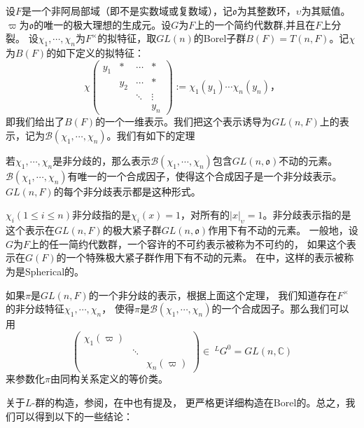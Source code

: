   \begin{example}
  设$F$是一个非阿局部域（即不是实数域或复数域），记$\mathfrak{o}$为其整数环，$\upsilon$为其赋值。
  $\varpi$为$\mathfrak{o}$的唯一的极大理想的生成元。设$G$为$F$上的一个简约代数群,并且在$F$上分裂。
  设$\chi_1,\cdots,\chi_n$为$F^{\times}$的拟特征，取$GL(n)$的Borel子群$B(F)=
  T(n,F)$。记$\chi$为$B(F)$的如下定义的拟特征：
  $$\chi\left(
  \begin{array}{llll}
  y_1 & \ast & \cdots & \ast \\
  & y_2 &\cdots & \ast       \\
  & & \ddots & \vdots        \\
  & & & y_n
  \end{array}\right)
  := \chi_1(y_1)\cdots \chi_n(y_n)，$$
  即我们给出了$B(F)$的一个一维表示。我们把这个表示诱导为$GL(n,F)$上的表示，记为$\mathcal
  {B}(\chi_1,\cdots,\chi_n)$。我们有如下的定理

  \begin{theorem}
  若$\chi_1,\cdots,\chi_n$是非分歧的，那么表示$\mathcal
  {B}(\chi_1,\cdots,\chi_n)$包含$GL(n, \mathfrak{o})$不动的元素。$\mathcal
  {B}(\chi_1,\cdots,\chi_n)$有唯一的一个合成因子，使得这个合成因子是一个非分歧表示。
  $GL(n,F)$的每个非分歧表示都是这种形式。
  \end{theorem}

  $\chi_i(1\leqslant i\leqslant n)$非分歧指的是$\chi_i(x) = 1$，对所有的$|x|_{\upsilon} =
  1$。非分歧表示指的是这个表示在$GL(n,F)$的极大紧子群$GL(n,\mathfrak{o})$作用下有不动的元素。
  一般地，设$G$为$F$上的任一简约代数群，一个容许的不可约表示被称为不可约的，
  如果这个表示在$G(F)$的一个特殊极大紧子群作用下有不动的元素。
  在中，这样的表示被称为是Spherical的。

  如果$\pi$是$GL(n,F)$的一个非分歧的表示，根据上面这个定理，
  我们知道存在$F^{\times}$的非分歧特征$\chi_1,\cdots,\chi_n$，
  使得$\pi$是$\mathcal {B}(\chi_1,\cdots,\chi_n)$的一个合成因子。那么我们可以用
  \begin{equation}
  \label{eq1}
  \left(\begin{array}{lll}
  \chi_1(\varpi) & & \\
  & \ddots & \\
  & & \chi_n(\varpi)
  \end{array}\right)\in\ ^LG^0 = GL(n,\mathbb{C})
  \end{equation}
  来参数化$\pi$由同构关系定义的等价类。
  \end{example}

  关于$L$-群的构造，参阅，在中也有提及，
  更严格更详细构造在Borel的。总之，我们可以得到以下的一些结论：

